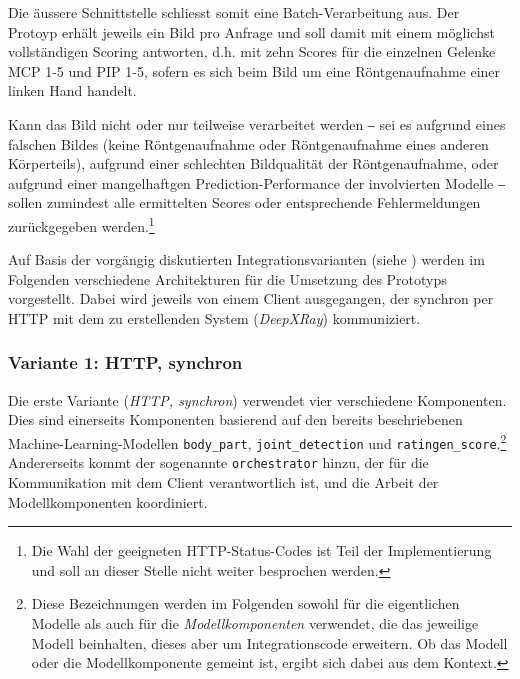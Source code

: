 Die äussere Schnittstelle schliesst somit eine Batch-Verarbeitung aus. Der Protoyp erhält jeweils ein Bild pro Anfrage und soll damit mit einem möglichst vollständigen Scoring antworten, d.h. mit zehn Scores für die einzelnen Gelenke MCP 1-5 und PIP 1-5, sofern es sich beim Bild um eine Röntgenaufnahme einer linken Hand handelt.

Kann das Bild nicht oder nur teilweise verarbeitet werden ‒ sei es aufgrund eines falschen Bildes (keine Röntgenaufnahme oder Röntgenaufnahme eines anderen Körperteils), aufgrund einer schlechten Bildqualität der Röntgenaufnahme, oder aufgrund einer mangelhaftgen Prediction-Performance der involvierten Modelle ‒ sollen zumindest alle ermittelten Scores oder entsprechende Fehlermeldungen zurückgegeben werden.\footnote{Die Wahl der geeigneten HTTP-Status-Codes ist Teil der Implementierung und soll an dieser Stelle nicht weiter besprochen werden.}

Auf Basis der vorgängig diskutierten Integrationsvarianten (siehe ) werden im Folgenden verschiedene Architekturen für die Umsetzung des Prototyps vorgestellt. Dabei wird jeweils von einem Client ausgegangen, der synchron per HTTP mit dem zu erstellenden System (\textit{DeepXRay}) kommuniziert.

\subsubsection{Variante 1: HTTP, synchron}

Die erste Variante (\textit{HTTP, synchron}) verwendet vier verschiedene Komponenten. Dies sind einerseits Komponenten basierend auf den bereits beschriebenen Machine-Learning-Mo\-dellen \texttt{body\_part}, \texttt{joint\_detection} und \texttt{ratingen\_score}.\footnote{Diese Bezeichnungen werden im Folgenden sowohl für die eigentlichen Modelle als auch für die \textit{Modellkomponenten} verwendet, die das jeweilige Modell beinhalten, dieses aber um Integrationscode erweitern. Ob das Modell oder die Modellkomponente gemeint ist, ergibt sich dabei aus dem Kontext.} Andererseits kommt der sogenannte \texttt{orchestrator} hinzu, der für die Kommunikation mit dem Client verantwortlich ist, und die Arbeit der Modellkomponenten koordiniert.

